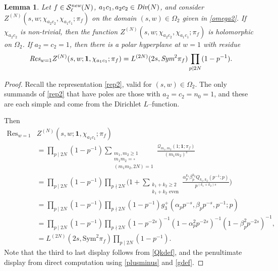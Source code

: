 \documentclass[12pt,reqno]{amsart}
\theoremstyle{plain}
\newtheorem{lemma}{Lemma}
\theoremstyle{remark}
\numberwithin{equation}{section}
\numberwithin{lemma}{section}
\numberwithin{theorem}{section}
\numberwithin{prop}{section}
\numberwithin{remark}{section}
\begin{document}
\begin{lemma} \label{R1}
Let $f \in \mathcal{S}^{\emph{new}}_{\ell}(N)$,
$a_1 c_1, a_2 c_2 \in \emph{Div}(N)$, and consider 
$Z^{(N)}(s,w;\chi_{a_2 c_2}, \chi_{a_1 c_1};\pi_f)$
on the domain $(s,w) \in \Omega_2$ given in \eqref{omega2}.
If $\chi_{a_2 c_2}$ is non-trivial, then the function  
$Z^{(N)}(s,w;\chi_{a_2 c_2}, \chi_{a_1 c_1};\pi_f)$ is holomorphic on $\Omega_2$.
If $a_2=c_2=1$, then there is a polar hyperplane at $w=1$ with residue
\begin{equation*} 
\emph{Res}_{w=1} Z^{(N)}(s,w;\mathbf{1},\chi_{a_1 c_1};\pi_f)=
L^{(2N)}(2s,\emph{Sym}^2 \pi_f ) \prod_{p \mid 2N}(1-p^{-1}).
\end{equation*}
\end{lemma}
\begin{proof}
Recall the representation \eqref{rep2}, valid for $(s,w) \in \Omega_2$.
 The only summands 
of \eqref{rep2} that have poles are those with $a_2=c_2=n_0=1$, and these are each simple and 
come from the Dirichlet $L$--function. 

Then 
\begin{align} \label{resid1}
\text{Res}_{w=1} & Z^{(N)}(s,w;\mathbf{1}, \chi_{a_1 c_1};\pi_f) \\
 &=\prod_{p \mid 2N} (1-p^{-1}) \sum_{\substack{m_1,m_2 \geq 1 \\ m_1 m_2=\square \\ 
(m_1 m_2, 2N)=1}} \frac{\mathcal{Q}_{m_1,m_2}(1;\mathbf{1};\pi_f)}{(m_1 m_2)^s} \nonumber \\
&=\prod_{p \mid 2N} (1-p^{-1}) \prod_{p \nmid 2N}  \Bigg(1+ \sum_{\substack{k_1+k_2 \geq 2 \\ k_1+k_2 \text{ even}} } 
\frac{\alpha_p^{k_1} \beta_p^{k_2} Q_{k_1,k_2}(p^{-1};p)}{p^{(k_1+k_2)s}} \Bigg) \nonumber  \\
&=\prod_{p \mid 2N} (1-p^{-1}) \prod_{p \nmid 2N} (1-p^{-1}) g_3^{+}(\alpha_p p^{-s},\beta_p p^{-s},p^{-1};p) \nonumber \\
&=\prod_{p \mid 2N} (1-p^{-1}) \prod_{p \nmid 2N} (1-p^{-2s})^{-1} (1-\alpha_p^2 p^{-2s} )^{-1} (1-\beta_p^2 p^{-2s} )^{-1}, \nonumber \\
&=L^{(2N)}(2s,\text{Sym}^2 \pi_f) \prod_{p \mid 2N} (1-p^{-1}).
\end{align}
Note that the third to last display follows from \eqref{Qkdef}, and the penultimate display from direct computation using
\eqref{plusminus} and \eqref{gdef}. 
\end{proof}
\end{document}
